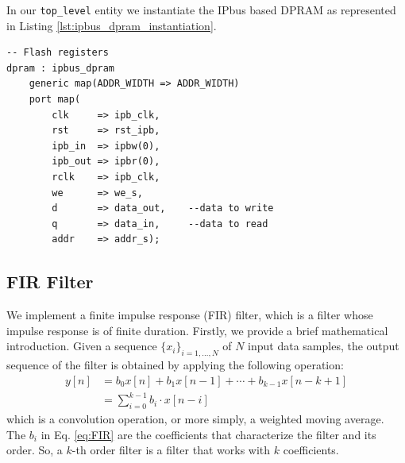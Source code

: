 \documentclass[11pt, a4paper]{article}
\begin{document}
\noindent
In our {\footnotesize\texttt{top\_level}} entity we instantiate the IPbus based DPRAM as represented in Listing \ref{lst:ipbus_dpram_instantiation}. 

\begin{lstlisting}[style=vhdl,label={lst:ipbus_dpram_instantiation},caption={{\footnotesize\texttt{ipbus\_dpram}} instantiation in the {\footnotesize\texttt{top\_level}}.}]
-- Flash registers
dpram : ipbus_dpram
	generic map(ADDR_WIDTH => ADDR_WIDTH)
	port map(
		clk     => ipb_clk,
		rst     => rst_ipb,
		ipb_in  => ipbw(0),
		ipb_out => ipbr(0),
		rclk    => ipb_clk,
		we      => we_s,
		d       => data_out,	--data to write
		q       => data_in,		--data to read
		addr    => addr_s);
\end{lstlisting}



\subsection{FIR Filter}
We implement a finite impulse response (FIR) filter, which is a filter whose impulse response is of finite duration.
Firstly, we provide a brief mathematical introduction. Given a sequence $\{x_i\}_{i=1,\dots,N}$ of $N$ input data samples, the output sequence of the filter is obtained by applying the following operation:
\begin{equation}
    \begin{aligned}
        y[n] &=b_{0} x[n]+b_{1} x[n-1]+\cdots+b_{k-1} x[n-k+1] \\
        &=\sum_{i=0}^{k-1} b_{i} \cdot x[n-i]
    \end{aligned}
    \label{eq:FIR}
\end{equation}
which is a convolution operation, or more simply, a weighted moving average. The $b_i$ in Eq. \ref{eq:FIR} are the coefficients that characterize the filter and its order. So, a $k$-th order filter is a filter that works with $k$ coefficients.


\end{document}
